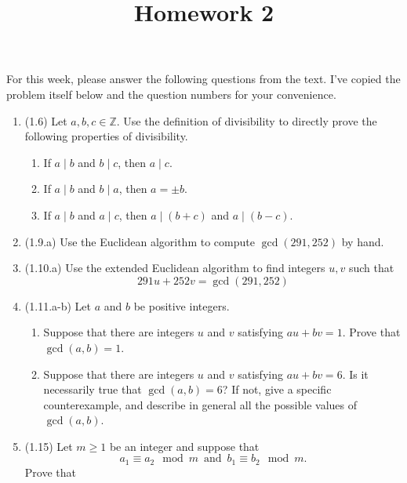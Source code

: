 \documentclass[12pt]{amsart}
\theoremstyle{definition}
\begin{document}
\title{Homework 2}

\maketitle

For this week, please answer the following questions from the text. 
I've copied the problem itself below and the question numbers for 
your convenience. 

\begin{enumerate}
	\item (1.6) Let $a,b,c \in \mathbb{Z}$. Use the definition of divisibility to directly prove
		the following properties of divisibility.
		\begin{enumerate}
			\item If $a \mid b$ and $b \mid c$, then $a \mid c$. 
			\item If $a \mid b$ and $b \mid a$, then $a = \pm b$.
			\item If $a \mid b$ and $a \mid c$, then $a \mid (b+c)$ and $a \mid (b-c)$.
		\end{enumerate}
	\item (1.9.a) Use the Euclidean algorithm to compute $\operatorname{gcd}(291,252)$ by hand. 
	\item (1.10.a) Use the extended Euclidean algorithm to find integers $u,v$ such that 
		\begin{displaymath}
			291u + 252v = \operatorname{gcd}(291,252)
		\end{displaymath}
	\item (1.11.a-b) Let $a$ and $b$ be positive integers. 
		\begin{enumerate}
			\item Suppose that there are integers $u$ and $v$ satisfying $au + bv = 1$. Prove 
			that $\operatorname{gcd}(a,b) = 1$. 
			\item Suppose that there are integers $u$ and $v$ satisfying $au + bv = 6$. Is 
				it necessarily true that $\operatorname{gcd}(a,b) = 6$? If not, give a 
				specific counterexample, and describe in general all the possible values 
				of $\operatorname{gcd}(a,b)$. 
		\end{enumerate}
	\item (1.15) Let $m \geq 1$ be an integer and suppose that 
		\begin{displaymath}
			a_1 \equiv a_2 \mod m \ \operatorname{and} \ b_1 \equiv b_2 \mod m.
		\end{displaymath}
		Prove that 
		\begin{displaymath}

\end{displaymath}
\end{enumerate}
\end{document}
